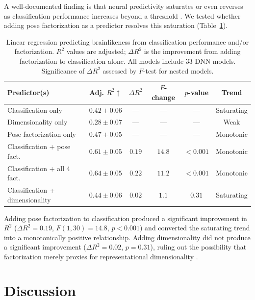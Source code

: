 \documentclass[11pt]{article}
\begin{document}
A well-documented finding is that neural predictivity saturates or even reverses as classification performance increases beyond a threshold \citep{schrimpf2018brain}. We tested whether adding pose factorization as a predictor resolves this saturation (Table~\ref{tab:regression}).

\begin{table}[H]
\centering
\caption{Linear regression predicting brainlikeness from classification performance and/or factorization. $R^2$ values are adjusted; $\Delta R^2$ is the improvement from adding factorization to classification alone. All models include 33 DNN models. Significance of $\Delta R^2$ assessed by $F$-test for nested models.}
\label{tab:regression}
\begin{tabular}{lccccc}
\toprule
\textbf{Predictor(s)} & \textbf{Adj. $R^2$}$\uparrow$ & \textbf{$\Delta R^2$} & \textbf{$F$-change} & \textbf{$p$-value} & \textbf{Trend} \\
\midrule
Classification only & $0.42 \pm 0.06$ & --- & --- & --- & Saturating \\
Dimensionality only & $0.28 \pm 0.07$ & --- & --- & --- & Weak \\
Pose factorization only & $0.47 \pm 0.05$ & --- & --- & --- & Monotonic \\
Classification + pose fact. & $\mathbf{0.61 \pm 0.05}$ & $0.19$ & $14.8$ & $< 0.001$ & Monotonic \\
Classification + all 4 fact. & $\mathbf{0.64 \pm 0.05}$ & $0.22$ & $11.2$ & $< 0.001$ & Monotonic \\
Classification + dimensionality & $0.44 \pm 0.06$ & $0.02$ & $1.1$ & $0.31$ & Saturating \\
\bottomrule
\end{tabular}
\end{table}

Adding pose factorization to classification produced a significant improvement in $R^2$ ($\Delta R^2 = 0.19$, $F(1,30) = 14.8$, $p < 0.001$) and converted the saturating trend into a monotonically positive relationship. Adding dimensionality did not produce a significant improvement ($\Delta R^2 = 0.02$, $p = 0.31$), ruling out the possibility that factorization merely proxies for representational dimensionality \citep{elmoznino2024high}.

\section{Discussion}
\end{document}
